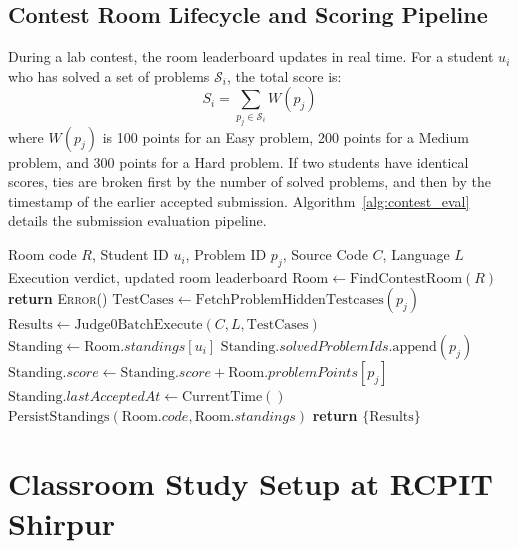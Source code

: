 \documentclass[12pt,a4paper]{article}
\begin{document}
\subsection{Contest Room Lifecycle and Scoring Pipeline}
During a lab contest, the room leaderboard updates in real time. For a student $u_i$ who has solved a set of problems $\mathcal{S}_i$, the total score is:
\begin{equation}
S_i = \sum_{p_j \in \mathcal{S}_i} W(p_j)
\end{equation}
where $W(p_j)$ is 100 points for an Easy problem, 200 points for a Medium problem, and 300 points for a Hard problem. If two students have identical scores, ties are broken first by the number of solved problems, and then by the timestamp of the earlier accepted submission. Algorithm~\ref{alg:contest_eval} details the submission evaluation pipeline.

\begin{algorithm}[!htbp]
\small
\caption{Contest Submission and Standings Update Pipeline}
\label{alg:contest_eval}
\begin{algorithmic}[1]
\REQUIRE Room code $R$, Student ID $u_i$, Problem ID $p_j$, Source Code $C$, Language $L$
\ENSURE Execution verdict, updated room leaderboard
\STATE $\text{Room} \leftarrow \text{FindContestRoom}(R)$
    \STATE \textbf{return} \textsc{Error}()
\ENDIF
\STATE $\text{TestCases} \leftarrow \text{FetchProblemHiddenTestcases}(p_j)$
\STATE $\text{Results} \leftarrow \text{Judge0BatchExecute}(C, L, \text{TestCases})$
    \STATE $\text{Standing} \leftarrow \text{Room}.standings[u_i]$
        \STATE $\text{Standing}.solvedProblemIds.\text{append}(p_j)$
        \STATE $\text{Standing}.score \leftarrow \text{Standing}.score + \text{Room}.problemPoints[p_j]$
        \STATE $\text{Standing}.lastAcceptedAt \leftarrow \text{CurrentTime}()$
        \STATE $\text{PersistStandings}(\text{Room}.code, \text{Room}.standings)$
    \ENDIF
\ENDIF
\STATE \textbf{return} $\{\text{Results}\}$
\end{algorithmic}
\end{algorithm}

\section{Classroom Study Setup at RCPIT Shirpur}
\label{sec:setup}
\end{document}
